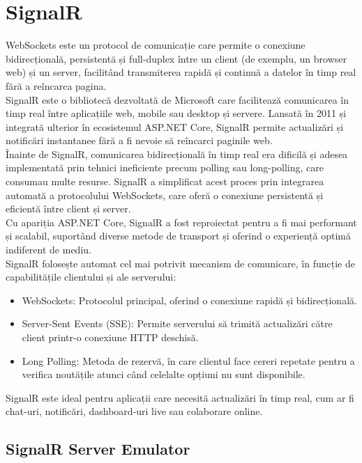 \section{SignalR}
 {\hspace*{1cm}WebSockets este un protocol de comunicație care permite o conexiune bidirecțională, persistentă și full-duplex între un client (de exemplu, un browser web) și un server, facilitând transmiterea rapidă și continuă a datelor în timp real fără a reîncarca pagina.}\parencite{signalR}\\
{\hspace*{1cm} SignalR este o bibliotecă dezvoltată de Microsoft care facilitează comunicarea în timp real între aplicațiile web, mobile sau desktop și servere. Lansată în 2011 și integrată ulterior în ecosistemul ASP.NET Core, SignalR permite actualizări și notificări instantanee fără a fi nevoie să reîncarci paginile web.}\parencite{signalR}\\
{Înainte de SignalR, comunicarea bidirecțională în timp real era dificilă și adesea implementată prin tehnici ineficiente precum polling sau long-polling, care consumau multe resurse. SignalR a simplificat acest proces prin integrarea automată a protocolului WebSockets, care oferă o conexiune persistentă și eficientă între client și server.}\parencite{signalR}\\
{Cu apariția ASP.NET Core, SignalR a fost reproiectat pentru a fi mai performant și scalabil, suportând diverse metode de transport și oferind o experiență optimă indiferent de mediu.}\parencite{signalR}\\
{SignalR folosește automat cel mai potrivit mecanism de comunicare, în funcție de capabilitățile clientului și ale serverului:}
\begin{itemize}
    \item WebSockets: Protocolul principal, oferind o conexiune rapidă și bidirecțională.
    \item Server-Sent Events (SSE): Permite serverului să trimită actualizări către client printr-o conexiune HTTP deschisă.
    \item Long Polling: Metoda de rezervă, în care clientul face cereri repetate pentru a verifica noutățile atunci când celelalte opțiuni nu sunt disponibile.
\end{itemize}\parencite{signalR}
{SignalR este ideal pentru aplicații care necesită actualizări în timp real, cum ar fi chat-uri, notificări, dashboard-uri live sau colaborare online.}
\subsection{SignalR Server Emulator}
